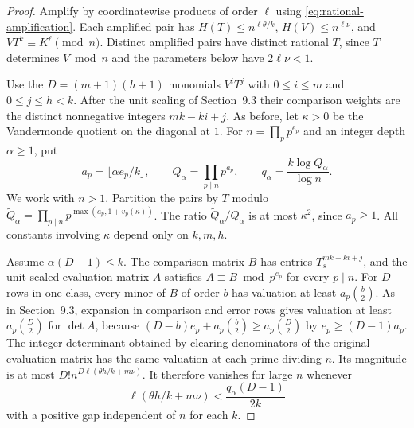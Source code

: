 \documentclass[11pt,reqno]{amsart}
\begin{document}
\begin{proof}
Amplify by coordinatewise products of order \(\ell\) using
\eqref{eq:rational-amplification}. Each amplified pair has
\(H(T)\le n^{\ell\theta/k}\), \(H(V)\le n^{\ell\nu}\), and
\(VT^k\equiv K^\ell\pmod n\). Distinct amplified pairs have
distinct rational \(T\), since \(T\) determines \(V\bmod n\)
and the parameters below have \(2\ell\nu<1\).

Use the \(D=(m+1)(h+1)\) monomials \(V^iT^j\) with
\(0\le i\le m\) and \(0\le j\le h<k\). After the unit
scaling of Section~9.3 their comparison weights are the
distinct nonnegative integers \(mk-ki+j\).
As before, let \(\kappa>0\) be the Vandermonde quotient on
the diagonal at \(1\). For \(n=\prod_pp^{e_p}\) and an
integer depth \(\alpha\ge1\), put
\[
 a_p=\lfloor\alpha e_p/k\rfloor,\qquad
 Q_\alpha=\prod_{p\mid n}p^{a_p},\qquad
 q_\alpha=\frac{k\log Q_\alpha}{\log n}.
\]
We work with \(n>1\). Partition the pairs by \(T\) modulo
\(\widetilde Q_\alpha=\prod_{p\mid n}p^{\max(a_p,1+v_p(\kappa))}\).
The ratio \(\widetilde Q_\alpha/Q_\alpha\) is at most
\(\kappa^2\), since \(a_p\ge1\). All constants involving
\(\kappa\) depend only on \(k,m,h\).

Assume \(\alpha(D-1)\le k\). The comparison matrix
\(B\) has entries \(T_s^{mk-ki+j}\), and the unit-scaled
evaluation matrix \(A\) satisfies \(A\equiv B\bmod p^{e_p}\)
for every \(p\mid n\). For \(D\) rows in one class,
every minor of \(B\) of order \(b\) has valuation at
least \(a_p\binom b2\).
As in Section~9.3, expansion in comparison and error
rows gives valuation at least \(a_p\binom D2\) for
\(\det A\), because
\((D-b)e_p+a_p\binom b2\ge a_p\binom D2\)
by \(e_p\ge(D-1)a_p\).
The integer determinant obtained by clearing denominators
of the original evaluation matrix has the same valuation
at each prime dividing \(n\). Its magnitude is at most
\(D!n^{D\ell(\theta h/k+m\nu)}\). It therefore vanishes for large
\(n\) whenever
\begin{equation}\label{eq:adaptive-height}
 \ell(\theta h/k+m\nu)<\frac{q_\alpha(D-1)}{2k}
\end{equation}
with a positive gap independent of \(n\) for each \(k\).


\end{proof}
\end{document}
